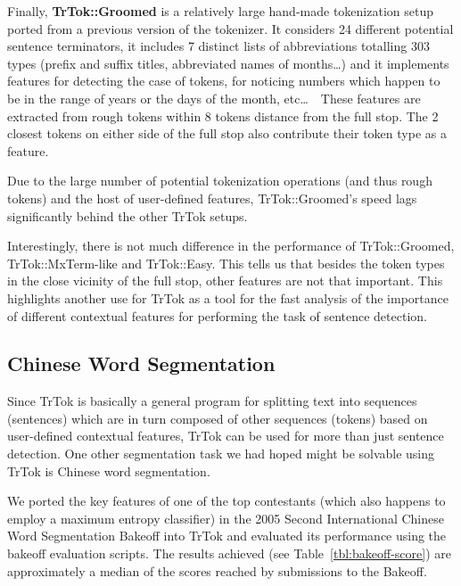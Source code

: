 Finally, \textbf{TrTok::Groomed} is a relatively large hand-made
tokenization setup ported from a previous version of the tokenizer. It
considers 24 different potential sentence terminators, it includes 7
distinct lists of abbreviations totalling 303 types (prefix and suffix
titles, abbreviated names of months\ldots) and it implements features
for detecting the case of tokens, for noticing numbers which happen to
be in the range of years or the days of the month, etc\ldots\ \ These
features are extracted from rough tokens within 8 tokens distance from
the full stop. The 2 closest tokens on either side of the full stop
also contribute their token type as a feature.

Due to the large number of potential tokenization operations (and thus
rough tokens) and the host of user-defined features, TrTok::Groomed's
speed lags significantly behind the other TrTok setups.

Interestingly, there is not much difference in the performance of
TrTok::Groomed, TrTok::MxTerm-like and TrTok::Easy. This tells us that
besides the token types in the close vicinity of the full stop, other
features are not that important. This highlights another use for TrTok
as a tool for the fast analysis of the importance of different
contextual features for performing the task of sentence detection.

\subsection{Chinese Word Segmentation}

Since TrTok is basically a general program for splitting text into
sequences (sentences) which are in turn composed of other sequences
(tokens) based on user-defined contextual features, TrTok can be used
for more than just sentence detection. One other segmentation task we
had hoped might be solvable using TrTok is Chinese word segmentation.

We ported the key features of one of the top contestants (which also
happens to employ a maximum entropy classifier)
\cite{seg-chinese-maxent} in the 2005 Second International Chinese
Word Segmentation Bakeoff into TrTok and evaluated its performance
using the bakeoff evaluation scripts. The results achieved (see
Table~\ref{tbl:bakeoff-score}) are approximately a median of the
scores reached by submissions to the Bakeoff.

